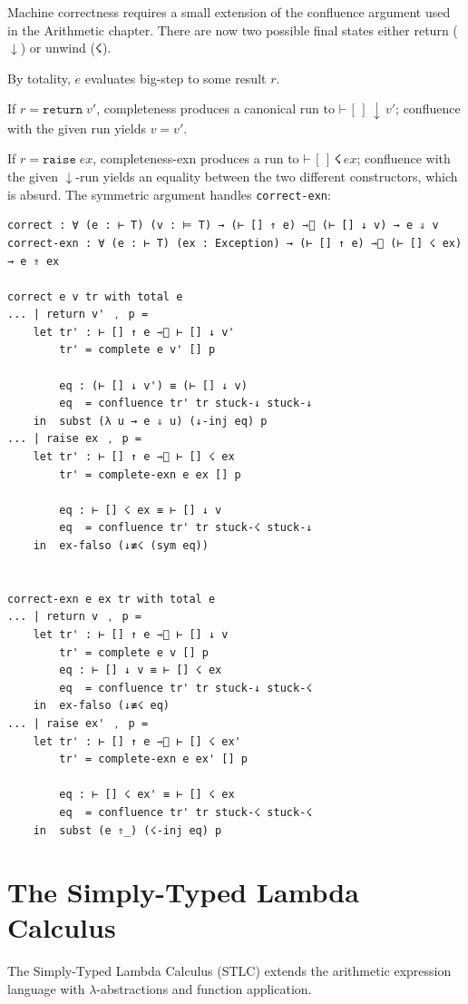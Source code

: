 Machine correctness requires a small extension of the confluence argument used in the Arithmetic chapter.
There are now two possible final states either return ($\downarrow$) or unwind ($\text{☇}$).

By totality, $e$ evaluates big-step to some result $r$.

If $r = \mathtt{return}\;v'$, completeness produces a canonical run to $\texttt{⊢}\,[\,]\,\downarrow\,v'$; confluence with the given run yields $v = v'$.

If $r = \mathtt{raise}\;ex$, completeness-exn produces a run to $\texttt{⊢}\,[\,]\,\text{☇}\,ex$; confluence with the given $\downarrow$-run yields an equality between the two different constructors, which is absurd.
The symmetric argument handles \texttt{correct-exn}:
\begin{verbatim}
correct : ∀ (e : ⊢ T) (v : ⊨ T) → (⊢ [] ↑ e) ⇾⃰ (⊢ [] ↓ v) → e ⇓ v
correct-exn : ∀ (e : ⊢ T) (ex : Exception) → (⊢ [] ↑ e) ⇾⃰ (⊢ [] ☇ ex) → e ⇑ ex

correct e v tr with total e
... | return v' ﹐ p =
    let tr' : ⊢ [] ↑ e ⇾⃰ ⊢ [] ↓ v'
        tr' = complete e v' [] p

        eq : (⊢ [] ↓ v') ≡ (⊢ [] ↓ v)
        eq  = confluence tr' tr stuck-↓ stuck-↓
    in  subst (λ u → e ⇓ u) (↓-inj eq) p
... | raise ex ﹐ p =
    let tr' : ⊢ [] ↑ e ⇾⃰ ⊢ [] ☇ ex
        tr' = complete-exn e ex [] p

        eq : ⊢ [] ☇ ex ≡ ⊢ [] ↓ v
        eq  = confluence tr' tr stuck-☇ stuck-↓
    in  ex-falso (↓≢☇ (sym eq))


correct-exn e ex tr with total e
... | return v ﹐ p =
    let tr' : ⊢ [] ↑ e ⇾⃰ ⊢ [] ↓ v
        tr' = complete e v [] p
        eq : ⊢ [] ↓ v ≡ ⊢ [] ☇ ex
        eq  = confluence tr' tr stuck-↓ stuck-☇
    in  ex-falso (↓≢☇ eq)
... | raise ex' ﹐ p =
    let tr' : ⊢ [] ↑ e ⇾⃰ ⊢ [] ☇ ex'
        tr' = complete-exn e ex' [] p

        eq : ⊢ [] ☇ ex' ≡ ⊢ [] ☇ ex
        eq  = confluence tr' tr stuck-☇ stuck-☇
    in  subst (e ⇑_) (☇-inj eq) p
\end{verbatim}

\chapter{The Simply-Typed Lambda Calculus}
\label{chap:stlc}

The Simply-Typed Lambda Calculus (STLC) extends the arithmetic expression language
with $\lambda$-abstractions and function application.

